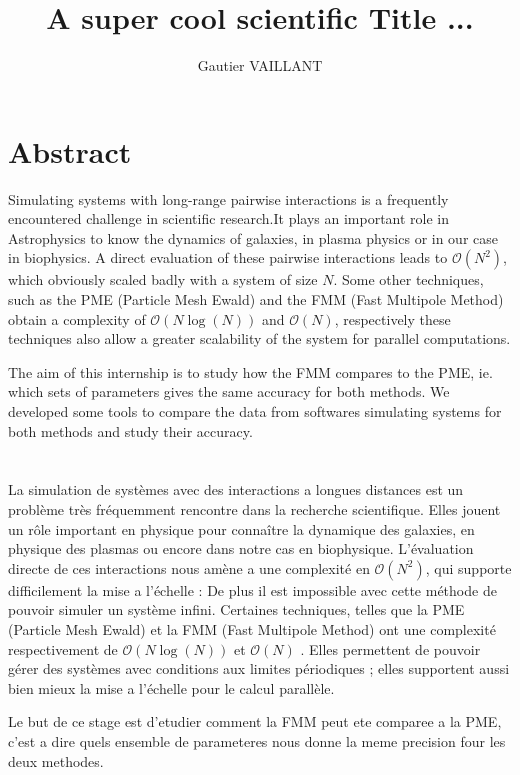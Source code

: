 \documentclass[11pt,twoside,a4paper]{report}
\title{A super cool scientific Title ...}
\author{Gautier VAILLANT}
\begin{document}
\maketitle



\chapter*{Abstract}

Simulating systems with long-range pairwise interactions is a frequently encountered challenge in scientific research.It plays an important role in Astrophysics to know the dynamics of galaxies, in plasma physics or in our case in biophysics.  A direct evaluation of these pairwise interactions leads to $\mathcal{O}(N^2)$, which obviously scaled badly with a system of size $N$. 
Some other techniques, such as the PME (Particle Mesh Ewald) and the FMM (Fast Multipole Method) obtain a complexity of $\mathcal{O}(N\log(N))$ and $\mathcal{O}(N)$,  respectively these techniques also allow a greater scalability of the system for parallel computations.

The aim of this internship is to study how the FMM compares to the PME, ie. which sets of parameters gives the same accuracy  for both methods. We developed some tools to compare the data from softwares simulating systems for both methods and study their accuracy. 
\\
\\
\\

La simulation de systèmes avec des interactions a longues distances est un problème très fréquemment rencontre dans la recherche scientifique. Elles jouent un rôle important en physique pour connaître la dynamique des galaxies, en physique des plasmas ou encore dans notre cas en biophysique. L'évaluation directe de ces interactions nous amène a une complexité en $\mathcal{O}(N^2)$, qui supporte difficilement la mise a l'échelle : De plus il est impossible avec cette méthode de pouvoir simuler un système infini.
	Certaines techniques, telles que la PME (Particle Mesh Ewald) et la FMM (Fast Multipole Method) ont une complexité respectivement de $\mathcal{O}(N\log(N))$ et $\mathcal{O}(N)$ . Elles permettent de pouvoir gérer des systèmes avec conditions aux limites périodiques ; elles supportent aussi bien mieux la mise a l'échelle pour le calcul parallèle.
	
	Le but de ce stage est d'etudier comment la FMM peut ete comparee a la PME, c'est a dire quels ensemble de parameteres nous donne la meme precision four les deux methodes.
\end{document}
